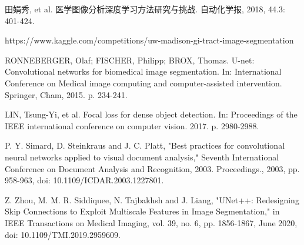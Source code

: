 \documentclass[letterpaper, 10pt, conference, twoside]{ieeeconf}
\begin{document}
\begin{thebibliography}{99}

田娟秀, et al. 医学图像分析深度学习方法研究与挑战. 自动化学报, 2018, 44.3: 401-424.

https://www.kaggle.com/competitions/uw-madison-gi-tract-image-segmentation

RONNEBERGER, Olaf; FISCHER, Philipp; BROX, Thomas. U-net: Convolutional networks for biomedical image segmentation. In: International Conference on Medical image computing and computer-assisted intervention. Springer, Cham, 2015. p. 234-241.

LIN, Tsung-Yi, et al. Focal loss for dense object detection. In: Proceedings of the IEEE international conference on computer vision. 2017. p. 2980-2988.

P. Y. Simard, D. Steinkraus and J. C. Platt, "Best practices for convolutional neural networks applied to visual document analysis," Seventh International Conference on Document Analysis and Recognition, 2003. Proceedings., 2003, pp. 958-963, doi: 10.1109/ICDAR.2003.1227801.

Z. Zhou, M. M. R. Siddiquee, N. Tajbakhsh and J. Liang, "UNet++: Redesigning Skip Connections to Exploit Multiscale Features in Image Segmentation," in IEEE Transactions on Medical Imaging, vol. 39, no. 6, pp. 1856-1867, June 2020, doi: 10.1109/TMI.2019.2959609.


\end{thebibliography}
\end{document}
